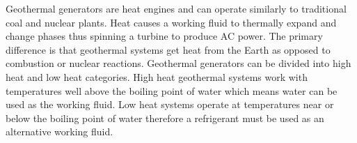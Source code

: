 Geothermal generators are heat engines and can operate similarly to traditional coal and nuclear plants. Heat causes a working fluid to thermally expand and change phases thus spinning a turbine to produce AC power. The primary difference is that geothermal systems get heat from the Earth as opposed to combustion or nuclear reactions. Geothermal generators can be divided into high heat and low heat categories. High heat geothermal systems work with temperatures well above the boiling point of water which means water can be used as the working fluid. Low heat systems operate at temperatures near or below the boiling point of water therefore a refrigerant must be used as an alternative working fluid. 



